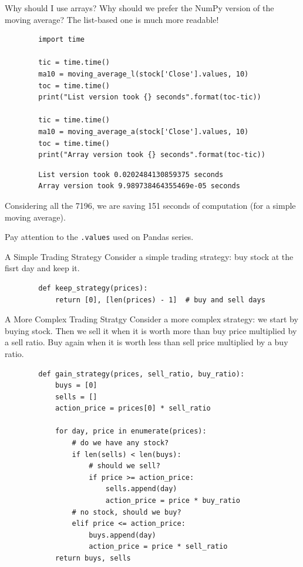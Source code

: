 \documentclass[aspectratio=169,]{beamer}
\begin{document}
\begin{frame}[fragile]{Why should I use arrays?}
    Why should we prefer the NumPy version of the moving average? The list-based one is much more readable!

    \begin{verbatim}
        import time

        tic = time.time()
        ma10 = moving_average_l(stock['Close'].values, 10)
        toc = time.time()
        print("List version took {} seconds".format(toc-tic))

        tic = time.time()
        ma10 = moving_average_a(stock['Close'].values, 10)
        toc = time.time()
        print("Array version took {} seconds".format(toc-tic))
    \end{verbatim}

    \begin{verbatim}
        List version took 0.0202484130859375 seconds
        Array version took 9.989738464355469e-05 seconds
    \end{verbatim}

    Considering all the 7196, we are saving 151 seconds of computation (for a simple moving average).

    Pay attention to the \texttt{.values} used on Pandas series.
\end{frame}

\begin{frame}[fragile]{A Simple Trading Strategy}
    Consider a simple trading strategy: buy stock at the fisrt day and keep it.

    \begin{verbatim}
        def keep_strategy(prices):
            return [0], [len(prices) - 1]  # buy and sell days
    \end{verbatim}
\end{frame}

\begin{frame}[fragile]{A More Complex Trading Stratgy}
    Consider a more complex strategy: we start by buying stock. Then we sell it when it is worth more than buy price
    multiplied by a sell ratio.
    Buy again when it is worth less than sell price multiplied by a buy ratio.

    \begin{verbatim}
        def gain_strategy(prices, sell_ratio, buy_ratio):
            buys = [0]
            sells = []
            action_price = prices[0] * sell_ratio

            for day, price in enumerate(prices):
                # do we have any stock?
                if len(sells) < len(buys):
                    # should we sell?
                    if price >= action_price:
                        sells.append(day)
                        action_price = price * buy_ratio
                # no stock, should we buy?
                elif price <= action_price:
                    buys.append(day)
                    action_price = price * sell_ratio
            return buys, sells
    \end{verbatim}
\end{frame}
\end{document}
